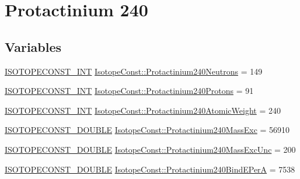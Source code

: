 \hypertarget{group___isotope_const-_protactinium-_pa240}{}\section{Protactinium 240}
\label{group___isotope_const-_protactinium-_pa240}
\subsection*{Variables}
\begin{DoxyCompactItemize}
\item 
\mbox{\hyperlink{group___isotope_const-_macros_ga5f18360b3e99483a35c32d789e62621c}{I\+S\+O\+T\+O\+P\+E\+C\+O\+N\+S\+T\+\_\+\+I\+NT}} \mbox{\hyperlink{group___isotope_const-_protactinium-_pa240_ga6c12a59fb053db897129a25f2e2f6962}{Isotope\+Const\+::\+Protactinium240\+Neutrons}} = 149
\item 
\mbox{\hyperlink{group___isotope_const-_macros_ga5f18360b3e99483a35c32d789e62621c}{I\+S\+O\+T\+O\+P\+E\+C\+O\+N\+S\+T\+\_\+\+I\+NT}} \mbox{\hyperlink{group___isotope_const-_protactinium-_pa240_ga22e9336f554313c7ed035d98433c2dc8}{Isotope\+Const\+::\+Protactinium240\+Protons}} = 91
\item 
\mbox{\hyperlink{group___isotope_const-_macros_ga5f18360b3e99483a35c32d789e62621c}{I\+S\+O\+T\+O\+P\+E\+C\+O\+N\+S\+T\+\_\+\+I\+NT}} \mbox{\hyperlink{group___isotope_const-_protactinium-_pa240_ga5f3050a62beb7accdb15a923179b6156}{Isotope\+Const\+::\+Protactinium240\+Atomic\+Weight}} = 240
\item 
\mbox{\hyperlink{group___isotope_const-_macros_ga8f45a7272ce02c0b4c65c44636ed719a}{I\+S\+O\+T\+O\+P\+E\+C\+O\+N\+S\+T\+\_\+\+D\+O\+U\+B\+LE}} \mbox{\hyperlink{group___isotope_const-_protactinium-_pa240_ga277ec2b76bce090e8a1622934ebb1e22}{Isotope\+Const\+::\+Protactinium240\+Mass\+Exc}} = 56910
\item 
\mbox{\hyperlink{group___isotope_const-_macros_ga8f45a7272ce02c0b4c65c44636ed719a}{I\+S\+O\+T\+O\+P\+E\+C\+O\+N\+S\+T\+\_\+\+D\+O\+U\+B\+LE}} \mbox{\hyperlink{group___isotope_const-_protactinium-_pa240_ga2e13ee61a09a22cd605dc2c1b57209bd}{Isotope\+Const\+::\+Protactinium240\+Mass\+Exc\+Unc}} = 200
\item 
\mbox{\hyperlink{group___isotope_const-_macros_ga8f45a7272ce02c0b4c65c44636ed719a}{I\+S\+O\+T\+O\+P\+E\+C\+O\+N\+S\+T\+\_\+\+D\+O\+U\+B\+LE}} \mbox{\hyperlink{group___isotope_const-_protactinium-_pa240_ga63164f43d215b3ac31e060e16b6e8580}{Isotope\+Const\+::\+Protactinium240\+Bind\+E\+PerA}} = 7538

\end{DoxyCompactItemize}

